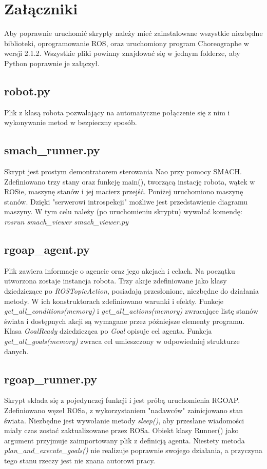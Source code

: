 \chapter{Załączniki}

Aby poprawnie uruchomić skrypty należy mieć zainstalowane wszystkie niezbędne biblioteki, oprogramowanie ROS, oraz uruchomiony program Choreographe w wersji 2.1.2. Wszystkie pliki powinny znajdować się w jednym folderze, aby Python poprawnie je załączył.

\section*{robot.py}
Plik z klasą robota pozwalający na automatyczne połączenie się z nim i wykonywanie metod w bezpieczny sposób.


\section*{smach\_runner.py}
Skrypt jest prostym demontratorem sterowania Nao przy pomocy SMACH. Zdefiniowano trzy stany oraz funkcję main(), tworzącą instację robota, wątek w ROSie, maszynę stanów i jej macierz przejść. Poniżej uruchomiono maszynę stanów. Dzięki "serwerowi introspekcji" możliwe jest przedstawienie diagramu maszyny. W tym celu należy (po uruchomieniu skryptu) wywołać komendę: \textit{rosrun smach\_viewer smach\_viewer.py}


\section*{rgoap\_agent.py}
Plik zawiera informacje o agencie oraz jego akcjach i celach. Na początku utworzona zostaje instancja robota. Trzy akcje zdefiniowane jako klasy dziedziczące po \textit{ROSTopicAction}, posiadają przesłonione, niezbędne do działania metody. W ich konstruktorach zdefiniowano warunki i efekty. Funkcje \textit{get\_all\_conditions(memory)} i \textit{get\_all\_actions(memory)} zwracające listę stanów świata i dostępnych akcji są wymagane przez późniejsze elementy programu. Klasa \textit{GoalReady} dziedzicząca po \textit{Goal} opisuje cel agenta. Funkcja \textit{get\_all\_goals(memory)} zwraca cel umieszczony w odpowiedniej strukturze danych.


\section*{rgoap\_runner.py}
Skrypt składa się z pojedynczej funkcji i jest próbą uruchomienia RGOAP. Zdefiniowano węzeł ROSa, z wykorzystaniem "nadawców" zainicjowano stan świata. Niezbędne jest wywołanie metody \textit{sleep()}, aby przesłane wiadomości miały czas zostać zaktualizowane przez ROSa. Obiekt klasy Runner() jako argument przyjmuje zaimportowany plik z definicją agenta. Niestety metoda \textit{plan\_and\_execute\_goals()} nie realizuje poprawnie swojego działania, a przyczyna tego stanu rzeczy jest nie znana autorowi pracy.

